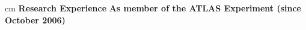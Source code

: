 \documentclass[12pt]{article}
\begin{document}



 cm
{\bf \large Research Experience}
\vskip 0.2cm
\hskip 0.1cm {\bf As member of the ATLAS Experiment (since October 2006)}\\
\end{document}
